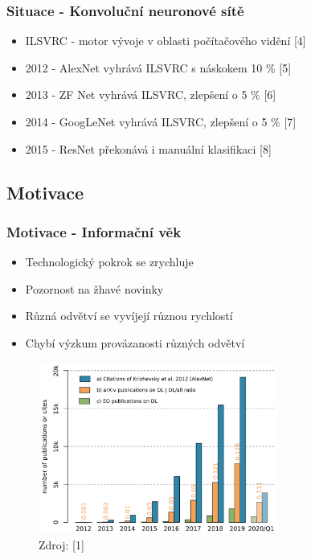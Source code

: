 \documentclass[10pt, t]{beamer}
\begin{document}
\begin{frame}

\frametitle{Situace - Konvoluční neuronové sítě}

\begin{itemize}
	\item ILSVRC - motor vývoje v oblasti počítačového vidění [4]
	\item 2012 - AlexNet vyhrává ILSVRC s náskokem 10 \% [5]
	\item 2013 - ZF Net vyhrává ILSVRC, zlepšení o 5 \% [6]
	\item 2014 - GoogLeNet vyhrává ILSVRC, zlepšení o 5 \% [7]
	\item 2015 - ResNet překonává i manuální klasifikaci [8]
\end{itemize}

\end{frame}


\subsection{Motivace}


\begin{frame}

\frametitle{Motivace - Informační věk}

\begin{itemize}
	\item Technologický pokrok se zrychluje
	\item Pozornost na žhavé novinky
	\item Různá odvětví se vyvíjejí různou rychlostí
	\item Chybí výzkum provázanosti různých odvětví
\end{itemize}

\begin{figure}[ht]
	\includegraphics[width=0.7\textwidth]{../pictures/dl-papers.png}
	\caption{Zdroj: [1]}
\end{figure}

\end{frame}
\end{document}
